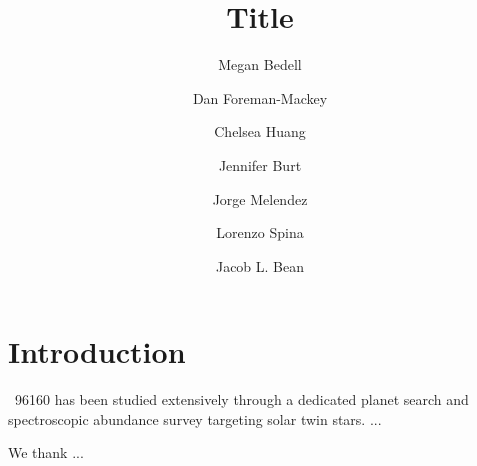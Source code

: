 \documentclass[modern]{aastex62}
\newcommand{\hoststar}{\acronym{HIP}\ 96160\xspace}
\begin{document}
\sloppy\sloppypar\raggedbottom\frenchspacing %

\graphicspath{ {figures/} }

\title{Title}

\author[0000-0001-9907-7742]{Megan Bedell}
\affiliation{\flatiron}

\author{Dan Foreman-Mackey}
\affiliation{\flatiron}

\author{Chelsea Huang}
\affiliation{\MIT}

\author{Jennifer Burt}
\affiliation{\MIT}

\author{Jorge Melendez}
\affiliation{\USP}

\author{Lorenzo Spina}

\author{Jacob L. Bean}
\affiliation{\chicago}


\author{}





\begin{abstract}\noindent
{}
\end{abstract}


\section{Introduction}
\label{s:intro}

\hoststar has been studied extensively through a dedicated \RV planet search and spectroscopic abundance survey targeting solar twin stars. ...

\acknowledgements
We thank ...





\end{document}
